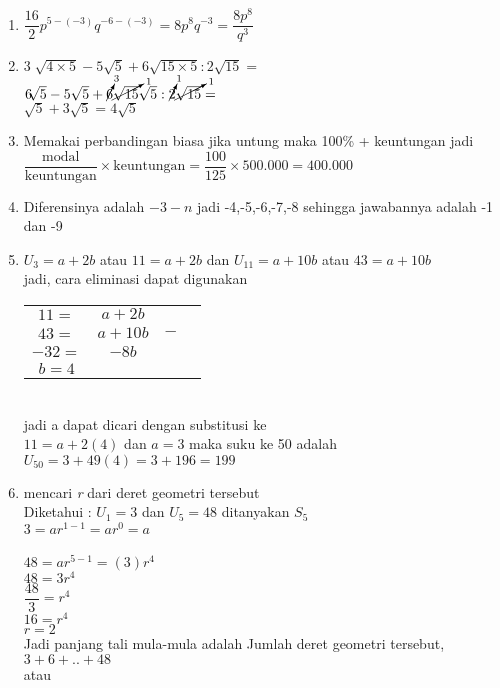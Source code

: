 \documentclass[10pt,a4paper]{article}
\begin{document}
\begin{enumerate}
\begin{enumerate}
		\end{enumerate}
	\item $\dfrac{16}{2}p^{5-(-3)}q^{-6-(-3)}=8p^8q^{-3}=\dfrac{8p^8}{q^3}$
	\item $3\sqrt[]{4\times 5}-5\sqrt{5}+6\sqrt{15\times 5}: 2\sqrt{15}=$\\
		  $6\sqrt[]{5}-5\sqrt{5}+\cancelto{3}{6}\cancelto{1}{\sqrt{15}} \sqrt{5}: 
		  \cancelto{1}{2}\cancelto{1}{\sqrt{15}}=$\\
		  $\sqrt{5}+3\sqrt{5}=4\sqrt{5}$ 
	\item Memakai perbandingan biasa jika untung maka 100\% + keuntungan jadi 
		 \\
		 $\dfrac{\text{modal}}{\text{keuntungan}}\times \text{keuntungan}= \dfrac{100}{125}\times 500.000= 400.000$
	\item Diferensinya adalah $-3-n$ jadi -4,-5,-6,-7,-8 sehingga jawabannya adalah -1 dan -9
	\item $U_3=a+2b$ atau $11=a+2b$ dan $U_{11}=a+10b$ atau $43=a+10b$\\
	jadi, cara eliminasi dapat digunakan \\
	\begin{tabular}{cccc}
	  $11=$&$a+2b$&  &  \\ 
	  $43=$&$a+10b$& $-$  &  \\ 
	  \hline
      $-32=$&$-8b$	&  & \\
	  $  b=4$& & &
	\end{tabular} \\
	jadi a dapat dicari dengan substitusi ke\\ $11=a+2(4)$ dan $a=3$
	maka suku ke 50 adalah\\
	$U_{50}=3+49(4)=3+196=199$
	\item mencari \textit{r} dari deret geometri tersebut\\
	 Diketahui : $U_1=3$ dan $U_5=48$ ditanyakan $S_5$\\
		$3=ar^{1-1}=ar^0=a$\\
		\\
		$48=ar^{5-1}=(3)r^4$\\
		$48=3r^4$ \medskip \\ 
		$\dfrac{48}{3}=r^4$\medskip \\
		$16=r^4$\\
		$r=2$\\
		Jadi panjang tali mula-mula adalah Jumlah deret geometri tersebut,\\
		$3+6+..+48$\\
		atau\medskip \\

\end{enumerate}
\end{document}
